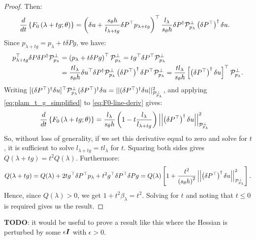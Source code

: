 \documentclass{standalone}
\begin{document}
\begin{proof}
  Then:
  \begin{align}\label{eq:F0-line-deriv}
    \frac{d}{dt} \left\{F_0\left(\lambda + t g; \theta\right)\right\} &= \left(\delta u + \frac{s_\theta h}{l_{\lambda + t g}} \delta P^\top p_{\lambda + t g}\right)^\top \frac{l_\lambda}{s_\theta h} \delta P^\dagger \mathcal{P}^\perp_{p_\lambda} \left(\delta P^\top\right)^\dagger \delta u.
  \end{align}
  Since $p_{\lambda + tg} = p_\lambda + t \delta P g$, we have:
  \begin{align}\label{eq:plam_t_g_simplified}
    p_{\lambda + t g}^\top \delta P \delta P^\dagger \mathcal{P}^\perp_{p_\lambda} &= \left(p_\lambda + t \delta P g\right)^\top \mathcal{P}^\perp_{p_\lambda} = t g^\top \delta P^\top \mathcal{P}^\perp_{p_\lambda} \\
                                                                                   &= \frac{t l_\lambda}{s_\theta h} \delta u^\top \delta P^\dagger \mathcal{P}^\perp_{p_\lambda} \left(\delta P^\top\right)^\dagger \delta P^\top \mathcal{P}^\perp_{p_\lambda} = \frac{t l_\lambda}{s_\theta h} \left[\left(\delta P^\top\right)^\dagger \delta u\right]^\top \mathcal{P}^\perp_{p_\lambda}.
  \end{align}
  Writing
  $[(\delta P^\top)^\dagger \delta u]^\top \mathcal{P}^\perp_{p_\lambda}
  (\delta P^\top)^\dagger \delta u = ||(\delta P^\top)^\dagger \delta
  u||^2_{\mathcal{P}^\perp_{p_\lambda}}$, and applying
  \cref{eq:plam_t_g_simplified} to \cref{eq:F0-line-deriv} gives:
  \begin{align*}
    \frac{d}{dt} \left\{F_0\left(\lambda + t g; \theta\right)\right\} &= \frac{l_\lambda}{s_\theta h} \left(1 - t \frac{l_\lambda}{l_{\lambda + t g}}\right) \left|\left|\left(\delta P^\top\right)^\dagger \delta u\right|\right|^2_{\mathcal{P}^\perp_{p_\lambda}}
  \end{align*}
  So, without loss of generality, if we set this derivative equal to
  zero and solve for $t$, it is sufficient to solve
  $l_{\lambda + t g} = t l_\lambda$ for $t$. Squaring both sides gives
  $Q(\lambda + t g) = t^2 Q(\lambda)$. Furthermore:
  \begin{align*}
    Q(\lambda + tg) = Q(\lambda) + 2tg^\top \delta P^\top p_\lambda + t^2 g^\top \delta P^\top \delta P g = Q(\lambda) \left[1 + \frac{t^2}{{(s_\theta h)}^2} \left|\left|\left(\delta P^\top\right)^\dagger \delta u\right|\right|^2_{\mathcal{P}^\perp_{p_\lambda}}\right].
  \end{align*}
  Hence, since $Q(\lambda) > 0$, we get $1 + t^2 \beta_\lambda =
  t^2$. Solving for $t$ and noting that $t \leq 0$ is required gives
  us the result.
\end{proof}

\textbf{TODO}: it would be useful to prove a result like this where
the Hessian is perturbed by some $\epsilon \boldsymbol{I}$ with $\epsilon > 0$.
\end{document}
